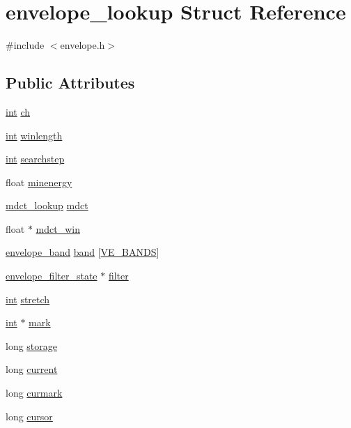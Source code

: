 \hypertarget{structenvelope__lookup}{}\section{envelope\+\_\+lookup Struct Reference}
\label{structenvelope__lookup}


{\ttfamily \#include $<$envelope.\+h$>$}

\subsection*{Public Attributes}
\begin{DoxyCompactItemize}
\item 
\hyperlink{xmltok_8h_a5a0d4a5641ce434f1d23533f2b2e6653}{int} \hyperlink{structenvelope__lookup_a5b6a11f7a3824c5c96d06319ef9a9b26}{ch}
\item 
\hyperlink{xmltok_8h_a5a0d4a5641ce434f1d23533f2b2e6653}{int} \hyperlink{structenvelope__lookup_a0dd3e4be45e14a1f562774245db3ba80}{winlength}
\item 
\hyperlink{xmltok_8h_a5a0d4a5641ce434f1d23533f2b2e6653}{int} \hyperlink{structenvelope__lookup_aa06fe3f540bbf51b3046705730201dd2}{searchstep}
\item 
float \hyperlink{structenvelope__lookup_ac6bb522bcac62b0c384101da560729ac}{minenergy}
\item 
\hyperlink{structmdct__lookup}{mdct\+\_\+lookup} \hyperlink{structenvelope__lookup_a76d53a8e25d46b90080f89a14f798f59}{mdct}
\item 
float $\ast$ \hyperlink{structenvelope__lookup_afdef34e306699f8959e2cd930b0a2f9d}{mdct\+\_\+win}
\item 
\hyperlink{structenvelope__band}{envelope\+\_\+band} \hyperlink{structenvelope__lookup_af041a323f12911941c4fe57e3ec034e2}{band} \mbox{[}\hyperlink{lib-src_2libvorbis_2lib_2_envelope_8h_a9309f3ce540b562a832e378b7f58d807}{V\+E\+\_\+\+B\+A\+N\+DS}\mbox{]}
\item 
\hyperlink{structenvelope__filter__state}{envelope\+\_\+filter\+\_\+state} $\ast$ \hyperlink{structenvelope__lookup_a452c1b6a0761208bba1eab35c46135c6}{filter}
\item 
\hyperlink{xmltok_8h_a5a0d4a5641ce434f1d23533f2b2e6653}{int} \hyperlink{structenvelope__lookup_af12cc9298483d0d8a8d271d4f24b3ee7}{stretch}
\item 
\hyperlink{xmltok_8h_a5a0d4a5641ce434f1d23533f2b2e6653}{int} $\ast$ \hyperlink{structenvelope__lookup_a6f29d293e9145cc273c743b88e780639}{mark}
\item 
long \hyperlink{structenvelope__lookup_aab813e353366d427ac743660ad963f9d}{storage}
\item 
long \hyperlink{structenvelope__lookup_a0b641f4d66293a18307e697b5e89892f}{current}
\item 
long \hyperlink{structenvelope__lookup_a9fb4f0c6d5414f1de4a272dd9cb06de0}{curmark}
\item 
long \hyperlink{structenvelope__lookup_a2c2c6e6d135b636d66a1c7f44a40b4d7}{cursor}
\end{DoxyCompactItemize}


